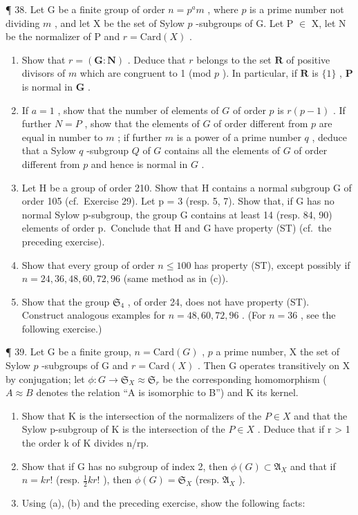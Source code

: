¶ 38. Let G be a finite group of order \(n = p^{a}m\) , where \(p\) is a prime number not dividing \(m\) , and let X be the set of Sylow \(p\) -subgroups of G. Let P \ensuremath{\in} X, let N be the normalizer of P and \(r = \text{Card}(X)\) .

\begin{enumerate}
\def\labelenumi{(\alph{enumi})}
\item
  Show that \(r = (\mathbf{G}:\mathbf{N})\) . Deduce that \(r\) belongs to the set \(\mathbf{R}\) of positive divisors of \(m\) which are congruent to 1 (mod \(p\) ). In particular, if \(\mathbf{R}\) is \(\{1\}\) , \(\mathbf{P}\) is normal in \(\mathbf{G}\) .
\item
  If \(a = 1\) , show that the number of elements of \(G\) of order \(p\) is \(r(p - 1)\) . If further \(N = P\) , show that the elements of \(G\) of order different from \(p\) are equal in number to \(m\) ; if further \(m\) is a power of a prime number \(q\) , deduce that a Sylow \(q\) -subgroup \(Q\) of \(G\) contains all the elements of \(G\) of order different from \(p\) and hence is normal in \(G\) .
\item
  Let H be a group of order 210. Show that H contains a normal subgroup G of order 105 (cf.~Exercise 29). Let p = 3 (resp. 5, 7). Show that, if G has no normal Sylow p-subgroup, the group G contains at least 14 (resp. 84, 90) elements of order p.~Conclude that H and G have property (ST) (cf.~the preceding exercise).
\item
  Show that every group of order \(n \leqslant 100\) has property (ST), except possibly if \(n = 24, 36, 48, 60, 72, 96\) (same method as in (c)).
\item
  Show that the group \(\mathfrak{S}_4\) , of order 24, does not have property (ST). Construct analogous examples for \(n = 48, 60, 72, 96\) . (For \(n = 36\) , see the following exercise.)
\end{enumerate}

¶ 39. Let G be a finite group, \(n = \text{Card}(G)\) , \(p\) a prime number, X the set of Sylow \(p\) -subgroups of G and \(r = \text{Card}(X)\) . Then G operates transitively on X by conjugation; let \(\phi: G \to \mathfrak{S}_{X} \approx \mathfrak{S}_r\) be the corresponding homomorphism ( \(A \approx B\) denotes the relation ``A is isomorphic to B'') and K its kernel.

\begin{enumerate}
\def\labelenumi{(\alph{enumi})}
\item
  Show that K is the intersection of the normalizers of the \(P \in X\) and that the Sylow p-subgroup of K is the intersection of the \(P \in X\) . Deduce that if r \textgreater{} 1 the order k of K divides n/rp.
\item
  Show that if G has no subgroup of index 2, then \(\phi(G) \subset \mathfrak{A}_{X}\) and that if \(n = kr!\) (resp. \(\frac{1}{2}kr!\) ), then \(\phi(G) = \mathfrak{S}_{X}\) (resp. \(\mathfrak{A}_{X}\) ).
\item
  Using (a), (b) and the preceding exercise, show the following facts:
\end{enumerate}

